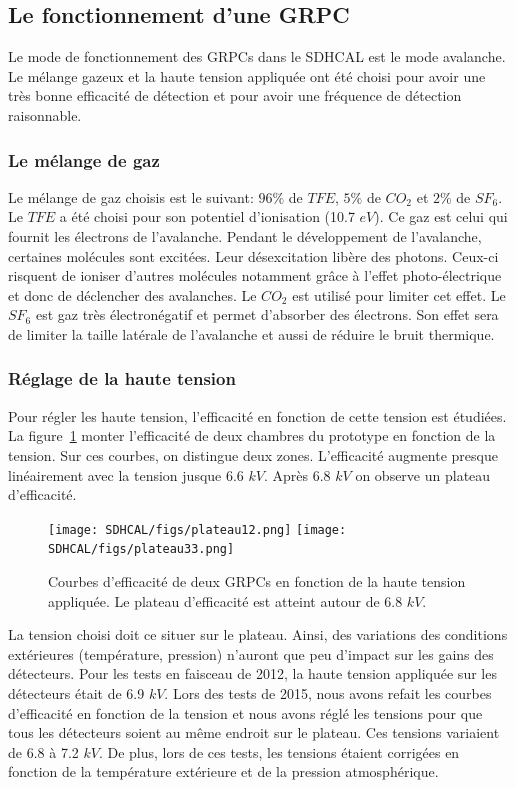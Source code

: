 \subsection{Le fonctionnement d'une GRPC}
Le mode de fonctionnement des GRPCs dans le SDHCAL est le mode avalanche. Le mélange gazeux et la haute tension appliquée ont été choisi pour avoir une très bonne efficacité de détection et pour avoir une fréquence de détection raisonnable. 
\subsubsection{Le mélange de gaz}
Le mélange de gaz choisis est le suivant: $96\%$ de $TFE$, $5\%$ de $CO_2$ et $2\%$ de $SF_6$. Le $TFE$ a été choisi pour son potentiel d'ionisation (10.7 $eV$). Ce gaz est celui qui fournit les électrons de l'avalanche. Pendant le développement de l'avalanche, certaines molécules sont excitées. Leur désexcitation libère des photons. Ceux-ci risquent de ioniser d'autres molécules notamment grâce à l'effet photo-électrique et donc de déclencher des avalanches. Le $CO_2$ est utilisé pour limiter cet effet. Le $SF_6$ est gaz très électronégatif et permet d'absorber des électrons. Son effet sera de limiter la taille latérale de l'avalanche et aussi de réduire le bruit thermique.

\subsubsection{Réglage de la haute tension}
Pour régler les haute tension, l'efficacité en fonction de cette tension est étudiées. La figure~\ref{fig:plateau} monter l'efficacité de deux chambres du prototype en fonction de la tension. Sur ces courbes, on distingue deux zones. L'efficacité augmente presque linéairement avec la tension jusque 6.6 $kV$. Après 6.8 $kV$ on observe un plateau d'efficacité. 
\begin{figure}[!h]
  \begin{center}
    \texttt{[image: SDHCAL/figs/plateau12.png]}
    \texttt{[image: SDHCAL/figs/plateau33.png]}
    \caption{Courbes d'efficacité de deux GRPCs en fonction de la haute tension appliquée. Le plateau d'efficacité est atteint autour de 6.8 $kV$.}
    \label{fig:plateau}
  \end{center}
\end{figure}
La tension choisi doit ce situer sur le plateau. Ainsi, des variations des conditions extérieures (température, pression) n'auront que peu d'impact sur les gains des détecteurs. Pour les tests en faisceau de 2012, la haute tension appliquée sur les détecteurs était de 6.9 $kV$. Lors des tests de 2015, nous avons refait les courbes d'efficacité en fonction de la tension et nous avons réglé les tensions pour que tous les détecteurs soient au même endroit sur le plateau. Ces tensions variaient de 6.8 à 7.2 $kV$. De plus, lors de ces tests, les tensions étaient corrigées en fonction de la température extérieure et de la pression atmosphérique. 

